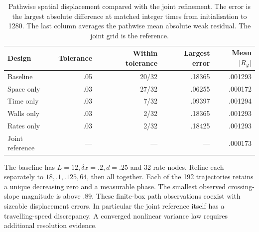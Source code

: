 \documentclass[11pt]{article}
\begin{document}
\begin{table}[htbp]\centering\small
\caption{Pathwise spatial displacement compared with the joint refinement.
The error is the largest absolute difference at matched integer times
from initialisation to 1280. The last column averages the pathwise mean
absolute weak residual. The joint grid is the reference.}
\begin{tabular}{lrrrr}\toprule
Design & Tolerance & Within tolerance & Largest error & Mean \(\lvert R_\varphi\rvert\)\\\midrule
Baseline & .05 & 20/32 & .18365 & .001293\\
Space only & .03 & 27/32 & .06255 & .000172\\
Time only & .03 & 7/32 & .09397 & .001294\\
Walls only & .03 & 2/32 & .18365 & .001293\\
Rates only & .03 & 2/32 & .18425 & .001293\\
Joint reference & --- & --- & --- & .000173\\\bottomrule
\end{tabular}\label{tab:nonlinear-convergence}\end{table}
The baseline has \(L=12,\delta x=.2,d=.25\) and 32 rate nodes.
Refine each separately to \(18,.1,.125,64\), then all together.
Each of the 192 trajectories retains a unique decreasing zero and a
measurable phase. The smallest observed crossing-slope magnitude is
above .89. These finite-box path observations coexist with sizeable
displacement errors. In particular the joint reference itself has a
travelling-speed discrepancy. A converged nonlinear variance law
requires additional resolution evidence.
\end{document}
